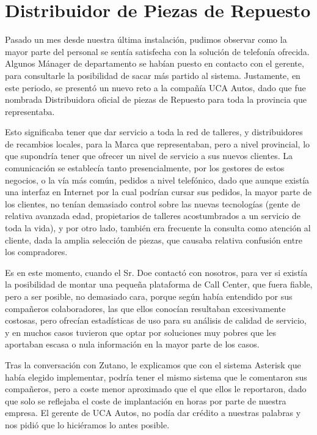 \newpage

\color[rgb]{0,0,1}

\section{Distribuidor de Piezas de Repuesto}

Pasado un mes desde nuestra última instalación, pudimos observar como la mayor parte del personal se sentía satisfecha con la solución de telefonía ofrecida. Algunos Mánager de departamento se habían puesto en contacto con el gerente, para consultarle la posibilidad de sacar más partido al sistema. Justamente, en este periodo, se presentó un nuevo reto a la compañía UCA Autos, dado que fue nombrada Distribuidora oficial de piezas de Repuesto para toda la provincia que representaba.

Esto significaba tener que dar servicio a toda la red de talleres, y distribuidores de recambios locales, para la Marca que representaban, pero a nivel provincial, lo que supondría tener que ofrecer un nivel de servicio a sus nuevos clientes. La comunicación se establecía tanto presencialmente, por los gestores de estos negocios, o la vía más común, pedidos a nivel telefónico, dado que aunque existía una interfaz en Internet por la cual podrían cursar sus pedidos, la mayor parte de los clientes, no tenían demasiado control sobre las nuevas tecnologías (gente de relativa avanzada edad, propietarios de talleres acostumbrados a un servicio de toda la vida), y por otro lado, también era frecuente la consulta como atención al cliente, dada la amplia selección de piezas, que causaba relativa confusión entre los compradores.

Es en este momento, cuando el Sr. Doe contactó con nosotros, para ver si existía la posibilidad de montar una pequeña plataforma de Call Center, que fuera fiable, pero a ser posible, no demasiado cara, porque según había entendido por sus compañeros colaboradores, las que ellos conocían resultaban excesivamente costosas, pero ofrecían estadísticas de uso para su análisis de calidad de servicio, y en muchos casos tuvieron que optar por soluciones muy pobres que les aportaban escasa o nula información en la mayor parte de los casos.

Tras la conversación con Zutano, le explicamos que con el sistema Asterisk que había elegido implementar, podría tener el mismo sistema que le comentaron sus compañeros, pero a coste menor aproximado que el que ellos le reportaron, dado que solo se reflejaba el coste de implantación en horas por parte de nuestra empresa. El gerente de UCA Autos, no podía dar crédito a nuestras palabras y nos pidió que lo hiciéramos lo antes posible.

